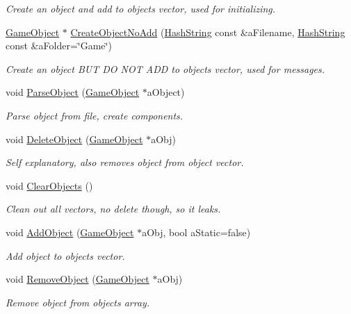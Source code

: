 \begin{DoxyCompactItemize}
\begin{DoxyCompactList}\small\item\em Create an object and add to objects vector, used for initializing. \end{DoxyCompactList}\item 
\hyperlink{classGameObject}{Game\+Object} $\ast$ \hyperlink{classObjectManager_af6c1f7608fba42cdff20582cb83c52e2}{Create\+Object\+No\+Add} (\hyperlink{classHashString}{Hash\+String} const \&a\+Filename, \hyperlink{classHashString}{Hash\+String} const \&a\+Folder=\char`\"{}Game\char`\"{})
\begin{DoxyCompactList}\small\item\em Create an object B\+UT DO N\+OT A\+DD to objects vector, used for messages. \end{DoxyCompactList}\item 
void \hyperlink{classObjectManager_a20aed1603ed0b8c8260f51d3b499433a}{Parse\+Object} (\hyperlink{classGameObject}{Game\+Object} $\ast$a\+Object)
\begin{DoxyCompactList}\small\item\em Parse object from file, create components. \end{DoxyCompactList}\item 
void \hyperlink{classObjectManager_a2e6cb8273f3a2c2c1e0df301b80d423d}{Delete\+Object} (\hyperlink{classGameObject}{Game\+Object} $\ast$a\+Obj)
\begin{DoxyCompactList}\small\item\em Self explanatory, also removes object from object vector. \end{DoxyCompactList}\item 
void \hyperlink{classObjectManager_a6d995f8d626cbb7e928bd8da0c96d9a8}{Clear\+Objects} ()
\begin{DoxyCompactList}\small\item\em Clean out all vectors, no delete though, so it leaks. \end{DoxyCompactList}\item 
void \hyperlink{classObjectManager_a9e37d55b2707d42eb4918db5927dae49}{Add\+Object} (\hyperlink{classGameObject}{Game\+Object} $\ast$a\+Obj, bool a\+Static=false)
\begin{DoxyCompactList}\small\item\em Add object to objects vector. \end{DoxyCompactList}\item 
void \hyperlink{classObjectManager_a90d8373d9cc30126405fb6b7ed2b5c92}{Remove\+Object} (\hyperlink{classGameObject}{Game\+Object} $\ast$a\+Obj)
\begin{DoxyCompactList}\small\item\em Remove object from objects array. \end{DoxyCompactList}\end{DoxyCompactItemize}
